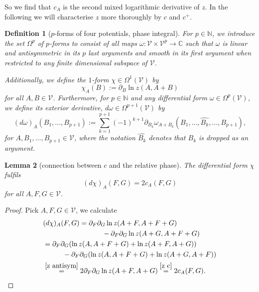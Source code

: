 \documentclass[b5paper,draft,openbib,12pt]{memoir}
\newtheorem{Def}{Definition}
\newtheorem{Lemma}[Def]{Lemma}
\begin{document}
So we find that \(c_A\) is the second mixed logarithmic 
derivative of \(z\). In the following we will 
characterise \(z\) more thoroughly by \(c\) and \(c^+\).
\begin{Def}[\(p\)-forms of four potentials, phase integral]
For \(p\in\mathbb{N}\), we introduce the set \(\Omega^p\) 
of \(p\)-forms 
to consist of all maps 
\(\omega: \mathcal{V}\times \mathcal{V}^{p}\rightarrow \mathbb{C}\)
such that \(\omega\) is linear and antisymmetric in its 
\(p\) last arguments and smooth in its first argument
when restricted to any finite
dimensional subspace of \(\mathcal{V}\).

Additionally, we define the \(1\)-form 
\(\chi\in \Omega^1(\mathcal{V})\) by
\begin{equation}\label{de chi}
\chi_A(B):=\partial_B\ln z(A,A+B)
\end{equation}
for all \(A,B\in\mathcal{V}\).
Furthermore, for \(p\in\mathbb{N}\) and any differential 
form \(\omega\in \Omega^p(\mathcal{V})\), 
we define its exterior derivative, 
\(d \omega\in\Omega^{p+1}(\mathcal{V})\) by
\begin{equation}
(d\omega)_A(B_1,\dots, B_{p+1}):=\sum_{k=1}^{p+1} (-1)^{k+1} 
\partial_{B_k}\omega_{A+B_k}(B_1,\dots , \widehat{B_k},\dots, B_{p+1}),
\end{equation}
for \(A,B_1,\dots, B_{p+1}\in\mathcal{V}\), where 
the notation \(\widehat{B_k}\) denotes that \(B_k\) is  
dropped as an argument.

\end{Def}

\begin{Lemma}[connection between \(c\) and the relative phase]\label{connection between c and the relative phase}
The differential form \(\chi\) fulfils 
\begin{equation}
(d\chi)_A(F,G)=2 c_A(F,G)
\end{equation}
for all \(A,F,G\in\mathcal{V}\).
\end{Lemma}
\begin{proof}
Pick \(A,F,G\in \mathcal{V}\), we calculate
\begin{align}\nonumber
&(d\chi)_A(F,G)=\partial_F\partial_G \ln z(A+F,A+F+G)\\
&\hspace{3cm}-\partial_F \partial_G \ln z(A+G,A+F+G)\\
&=\partial_F\partial_G (\ln  z(A,A+F+G)+\ln z(A+F,A+G))\\
 &\hspace{1cm} - \partial_F\partial_G(  \ln z(A,A+F+G)+\ln z(A+G,A+F))\\
&\overset{\eqref{z antisym}}{=} 2 \partial_F\partial_G \ln z(A+F,A+G)\overset{\eqref{z c}}{=}2 c_A(F,G).
\end{align}
\end{proof}
\end{document}
